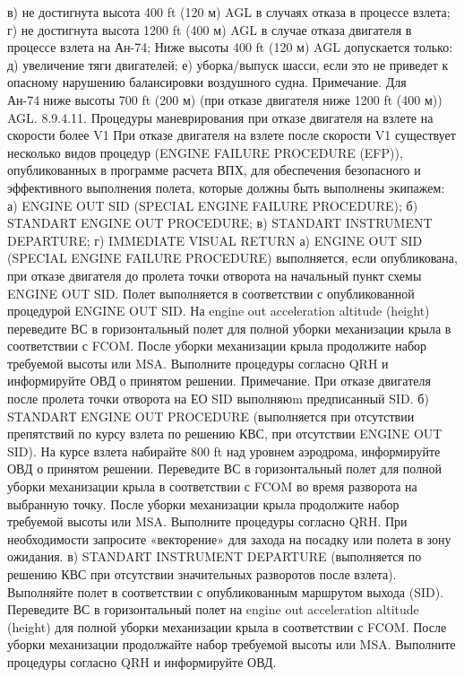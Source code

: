 в)	не достигнута высота 400 ft (120 м) AGL в случаях отказа в процессе взлета;
г)	не достигнута высота 1200 ft (400 м) AGL в случае отказа двигателя в процессе взлета на Ан-74;
Ниже высоты 400 ft (120 м) AGL допускается только: 
д)	увеличение тяги двигателей; 
е)	уборка/выпуск шасси, если это не приведет к опасному нарушению балансировки воздушного судна.
Примечание. Для Ан-74ниже высоты 700 ft (200 м) (при отказе двигателя ниже 1200 ft (400 м)) AGL.
8.9.4.11.	Процедуры маневрирования при отказе двигателя на взлете на скорости более V1
При отказе двигателя на взлете после скорости V1 существует несколько видов процедур (ENGINE FAILURE PROCEDURE (EFP)), опубликованных в программе расчета ВПХ, для обеспечения безопасного и эффективного выполнения полета, которые должны быть выполнены экипажем:
а)	ENGINE OUT SID (SPECIAL ENGINE FAILURE PROCEDURE); 
б)	STANDARТ ENGINE OUT PROCEDURE; 
в)	STANDART INSTRUMENT DEPARTURE; 
г)	IMMEDIATE VISUAL RETURN 
а) ENGINE OUT SID (SPECIAL ENGINE FAILURE PROCEDURE) выполняется, если опубликована, при отказе двигателя до пролета точки отворота на начальный пункт схемы ENGINE OUT SID. 
Полет выполняется в соответствии с опубликованной процедурой ENGINE OUT SID. На engine out acceleration altitude (height) переведите ВС в горизонтальный полет для полной уборки механизации крыла в соответствии с FCOM. После уборки механизации крыла продолжите набор требуемой высоты или MSA. Выполните процедуры согласно QRH и информируйте ОВД о принятом решении. 
Примечание. При отказе двигателя после пролета точки отворота на ЕО SID выполняюm предписанный SID. 
б) STANDARТ ENGINE OUT PROCEDURE (выполняется при отсутствии препятствий по курсу взлета по решению КВС, при отсутствии ENGINE OUT SID). 
На курсе взлета набирайте 800 ft над уровнем аэродрома, информируйте ОВД о принятом решении. Переведите ВС в горизонтальный полет для полной уборки механизации крыла в соответствии с FCOM во время разворота на выбранную точку. После уборки механизации крыла продолжите набор требуемой высоты или MSA. Выполните процедуры согласно QRH. При необходимости запросите «векторение» для захода на посадку или полета в зону ожидания. 
в) STANDART INSTRUMENT DEPARTURE (выполняется по решению КВС при отсутствии значительных разворотов после взлета). 
Выполняйте полет в соответствии с опубликованным маршрутом выхода (SID). Переведите ВС в горизонтальный полет на engine out acceleration altitude (height) для полной уборки механизации крыла в соответствии с FCOM. После уборки механизации продолжайте набор требуемой высоты или MSA. Выполните процедуры согласно QRH и информируйте ОВД. 
